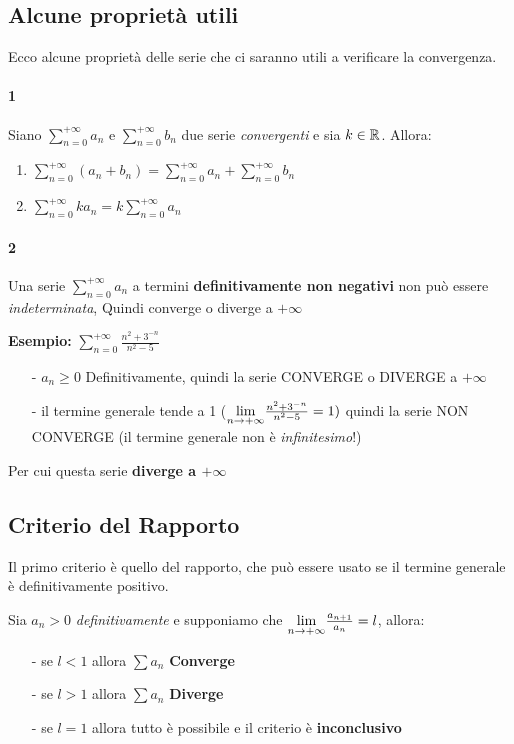 \documentclass[12pt, a4paper, openany]{book}
\newcommand{\esempio}[1]{\begin{box_esempio} \textbf{Esempio: }#1\end{box_esempio}}
\newcommand{\definizione}[1]{\begin{box_definizione} #1 \end{box_definizione}}
\begin{document}
\subsection{Alcune proprietà utili}
Ecco alcune proprietà delle serie che ci saranno utili a verificare la convergenza.

\paragraph*{1}Siano $\sum_{n=0}^{+\infty}a_n$ e $\sum_{n=0}^{+\infty}b_n$ due serie \emph{convergenti} e sia $k\in\mathbb{R}$.
Allora:
\begin{enumerate}
    \item $\sum_{n=0}^{+\infty}(a_n + b_n) = \sum_{n=0}^{+\infty}a_n + \sum_{n=0}^{+\infty}b_n$
    \item $\sum_{n=0}^{+\infty} k a_n = k \sum_{n=0}^{+\infty}a_n$
\end{enumerate}

\paragraph*{2} Una serie $\sum_{n=0}^{+\infty}a_n$ a termini \textbf{definitivamente non negativi} non può essere \emph{indeterminata},
Quindi converge o diverge a $+\infty$
\esempio{
    $\sum_{n=0}^{+\infty}\frac{n^2+3^{-n}}{n^2-5}$
    \begin{itemize}
        \item[-] $a_n \geq 0$ Definitivamente, quindi la serie CONVERGE o DIVERGE a $+\infty$
        \item[-] il termine generale tende a 1 ($\underset{n \to +\infty}{\lim} \frac{n^2+3^{-n}}{n^2-5} = 1)$ quindi la serie NON CONVERGE (il termine generale non è \emph{infinitesimo}!)  
    \end{itemize}
    Per cui questa serie \textbf{diverge a $+\infty$}
}

\subsection{Criterio del Rapporto}
Il primo criterio è quello del rapporto, che può essere usato se il termine generale è definitivamente positivo.
\definizione{
    Sia $a_n > 0$ \emph{definitivamente} e supponiamo che $\underset{n \to +\infty}{\lim} \frac{a_{n+1}}{a_n} = l$, allora:
    \begin{itemize}
        \item[-] se $l<1$ allora $\sum a_n$ \textbf{Converge}
        \item[-] se $l>1$ allora $\sum a_n$ \textbf{Diverge}
        \item[-] se $l=1$ allora tutto è possibile e il criterio è \textbf{inconclusivo}  
    \end{itemize}
}
\nb{che siccome $a_n > 0$ allora $l\in [0,+\infty)$ oppure $l = +\infty$}
\end{document}
